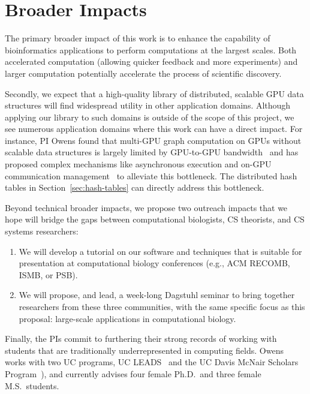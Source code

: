 \section{Broader Impacts}
\label{broadimpacts}

The primary broader impact of this work is to enhance the capability of bioinformatics applications to perform computations at the largest scales. Both accelerated computation (allowing quicker feedback and more experiments) and larger computation potentially accelerate the process of scientific discovery. 

Secondly, we expect that a high-quality library of distributed, scalable GPU data structures will find widespread utility in other application domains. Although applying our library to such domains is outside of the scope of this project, we see numerous application domains where this work can have a direct impact. For instance, PI Owens found that multi-GPU graph computation on GPUs without scalable data structures is largely limited by GPU-to-GPU bandwidth~\cite{Pan:2017:MGA} and has proposed complex mechanisms like asynchronous execution and on-GPU communication management~\cite{Chen:2022:SIP} to alleviate this bottleneck. The distributed hash tables in Section~\ref{sec:hash-tables} can directly address this bottleneck.

Beyond technical broader impacts, we propose two outreach impacts that we hope will bridge the gaps between computational biologists, CS theorists, and CS systems researchers:

\begin{enumerate}
  \item We will develop a tutorial on our software and techniques that is suitable for presentation at computational biology conferences (e.g., ACM RECOMB, ISMB, or PSB).
  \item We will propose, and lead, a week-long Dagstuhl seminar to bring together researchers from these three communities, with the same specific focus as this proposal: large-scale applications in computational biology.
\end{enumerate}

Finally, the PIs commit to furthering their strong records of working with students that are traditionally underrepresented in computing fields. Owens works with two UC programs, UC LEADS~\cite{UCLeads:2003:WEB} and the UC Davis McNair Scholars Program~\cite{McNair:2003:WEB}), and currently advises four female Ph.D.\ and three female M.S.\ students.

